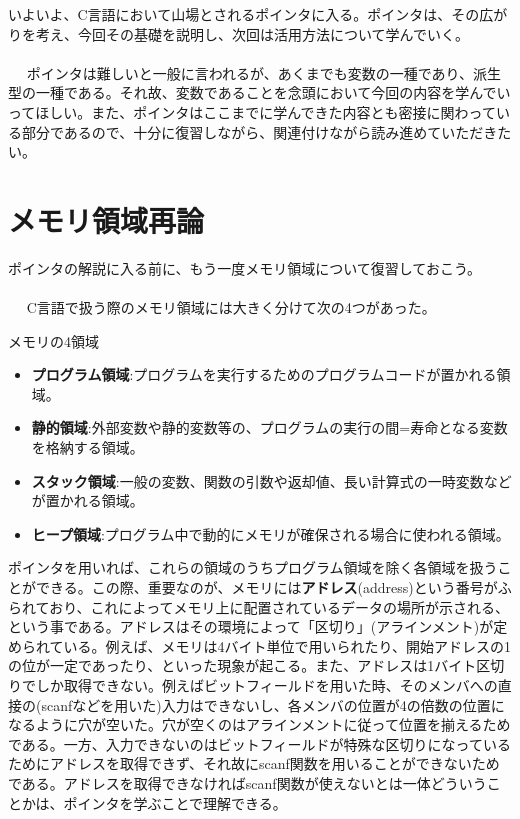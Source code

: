 いよいよ、C言語において山場とされるポインタに入る。ポインタは、その広がりを考え、今回その基礎を説明し、次回は活用方法について学んでいく。
\\ \\　
ポインタは難しいと一般に言われるが、あくまでも変数の一種であり、派生型の一種である。それ故、変数であることを念頭において今回の内容を学んでいってほしい。また、ポインタはここまでに学んできた内容とも密接に関わっている部分であるので、十分に復習しながら、関連付けながら読み進めていただきたい。

\section{メモリ領域再論}
ポインタの解説に入る前に、もう一度メモリ領域について復習しておこう。
\\ \\　
C言語で扱う際のメモリ領域には大きく分けて次の4つがあった。
\begin{itembox}[l]{メモリの4領域}
\begin{itemize}
\item \textbf{プログラム領域}:プログラムを実行するためのプログラムコードが置かれる領域。
\item \textbf{静的領域}:外部変数や静的変数等の、プログラムの実行の間=寿命となる変数を格納する領域。
\item \textbf{スタック領域}:一般の変数、関数の引数や返却値、長い計算式の一時変数などが置かれる領域。
\item \textbf{ヒープ領域}:プログラム中で動的にメモリが確保される場合に使われる領域。
\end{itemize}
\end{itembox}

ポインタを用いれば、これらの領域のうちプログラム領域を除く各領域を扱うことができる。この際、重要なのが、メモリには\textbf{アドレス}(address)という番号がふられており、これによってメモリ上に配置されているデータの場所が示される、という事である。アドレスはその環境によって「区切り」(アラインメント)が定められている。例えば、メモリは4バイト単位で用いられたり、開始アドレスの1の位が一定であったり、といった現象が起こる。また、アドレスは1バイト区切りでしか取得できない。例えばビットフィールドを用いた時、そのメンバへの直接の(scanfなどを用いた)入力はできないし、各メンバの位置が4の倍数の位置になるように穴が空いた。穴が空くのはアラインメントに従って位置を揃えるためである。一方、入力できないのはビットフィールドが特殊な区切りになっているためにアドレスを取得できず、それ故にscanf関数を用いることができないためである。アドレスを取得できなければscanf関数が使えないとは一体どういうことかは、ポインタを学ぶことで理解できる。

